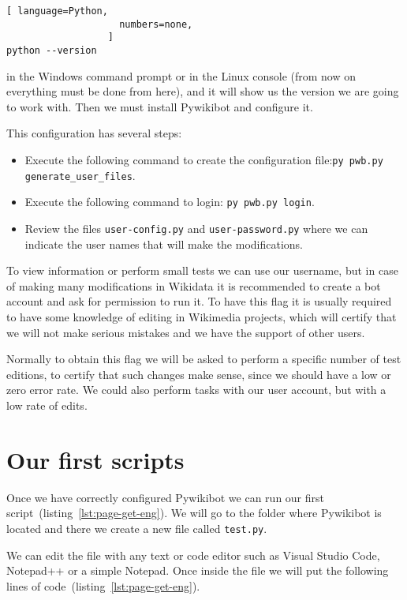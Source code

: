 \begin{lstlisting}[ language=Python,
                    numbers=none,
                  ]
python --version
\end{lstlisting}
in the Windows command prompt or in the Linux console (from now on everything must be done from here), and it will show us the version we are going to work with. Then we must install Pywikibot and configure it.

\newpage
This configuration has several steps:
\begin{itemize}
  \setlength{\itemindent}{2em}
  \item Execute the following command to create the configuration file:\newline \lstinline|py pwb.py generate_user_files|.
  \item Execute the following command to login: \lstinline|py pwb.py login|.
  \item Review the files \lstinline|user-config.py| and \lstinline|user-password.py| where we can indicate the user names that will make the modifications.
\end{itemize}

To view information or perform small tests we can use our username, but in case of making many modifications in Wikidata it is recommended to create a bot account and ask for permission to run it. To have this flag it is usually required to have some knowledge of editing in Wikimedia projects, which will certify that we will not make serious mistakes and we have the support of other users.

Normally to obtain this flag we will be asked to perform a specific number of test editions, to certify that such changes make sense, since we should have a low or zero error rate. We could also perform tasks with our user account, but with a low rate of edits.

\section{Our first scripts}

\label{sec:firstScript Eng}
Once we have correctly configured Pywikibot we can run our first script~(listing~\ref{lst:page-get-eng}). 
We will go to the folder where Pywikibot is located and there we create a new file called \lstinline|test.py|.

We can edit the file with any text or code editor such as Visual Studio Code, Notepad++ or a simple Notepad.
Once inside the file we will put the following lines of code~(listing~\ref{lst:page-get-eng}).

